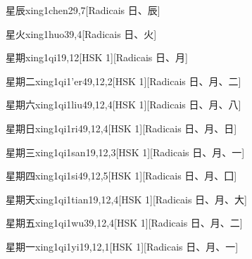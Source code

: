 \begin{entry}{星辰}{xing1chen2}{9,7}[Radicais ⽇、⾠]
\end{entry}

\begin{entry}{星火}{xing1huo3}{9,4}[Radicais ⽇、⽕]
\end{entry}

\begin{entry}{星期}{xing1qi1}{9,12}[HSK 1][Radicais ⽇、⽉]
\end{entry}

\begin{entry}{星期二}{xing1qi1'er4}{9,12,2}[HSK 1][Radicais ⽇、⽉、⼆]
\end{entry}

\begin{entry}{星期六}{xing1qi1liu4}{9,12,4}[HSK 1][Radicais ⽇、⽉、⼋]
\end{entry}

\begin{entry}{星期日}{xing1qi1ri4}{9,12,4}[HSK 1][Radicais ⽇、⽉、⽇]
\end{entry}

\begin{entry}{星期三}{xing1qi1san1}{9,12,3}[HSK 1][Radicais ⽇、⽉、⼀]
\end{entry}

\begin{entry}{星期四}{xing1qi1si4}{9,12,5}[HSK 1][Radicais ⽇、⽉、⼞]
\end{entry}

\begin{entry}{星期天}{xing1qi1tian1}{9,12,4}[HSK 1][Radicais ⽇、⽉、⼤]
\end{entry}

\begin{entry}{星期五}{xing1qi1wu3}{9,12,4}[HSK 1][Radicais ⽇、⽉、⼆]
\end{entry}

\begin{entry}{星期一}{xing1qi1yi1}{9,12,1}[HSK 1][Radicais ⽇、⽉、⼀]
\end{entry}

